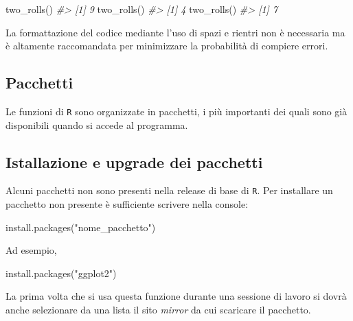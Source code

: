 \documentclass[
  11pt,
]{krantz}
\makeatletter
\newenvironment{Shaded}{\begin{snugshade}}{\end{snugshade}}
\newcommand{\CommentTok}[1]{\textcolor[rgb]{0.37,0.37,0.37}{\textit{#1}}}
\newcommand{\FunctionTok}[1]{\textcolor[rgb]{0,0,0}{#1}}
\newcommand{\NormalTok}[1]{#1}
\newcommand{\StringTok}[1]{\textcolor[rgb]{0.5,0.5,0.5}{#1}}
\newenvironment{kframe}{%
\medskip{}
\setlength{\fboxsep}{.8em}
 \def\at@end@of@kframe{}%
 \ifinner\ifhmode%
  \def\at@end@of@kframe{\end{minipage}}%
  \begin{minipage}{\columnwidth}%
 \fi\fi%
 \def\FrameCommand##1{\hskip\@totalleftmargin \hskip-\fboxsep
 \colorbox{shadecolor}{##1}\hskip-\fboxsep
     \hskip-\linewidth \hskip-\@totalleftmargin \hskip\columnwidth}%
 \MakeFramed {\advance\hsize-\width
   \@totalleftmargin\z@ \linewidth\hsize
   \@setminipage}}%
 {\par\unskip\endMakeFramed%
 \at@end@of@kframe}
\renewenvironment{Shaded}{\begin{kframe}}{\end{kframe}}
\theoremstyle{definition}
\theoremstyle{definition}
\theoremstyle{definition}
\theoremstyle{definition}
\theoremstyle{remark}
\makeatother
\begin{document}
\begin{Shaded}
\begin{Highlighting}[]
\FunctionTok{two\_rolls}\NormalTok{()   }
\CommentTok{\#\textgreater{} [1] 9}
\FunctionTok{two\_rolls}\NormalTok{()}
\CommentTok{\#\textgreater{} [1] 4}
\FunctionTok{two\_rolls}\NormalTok{()}
\CommentTok{\#\textgreater{} [1] 7}
\end{Highlighting}
\end{Shaded}

La formattazione del codice mediante l'uso di spazi e rientri non è necessaria ma è altamente raccomandata per minimizzare la probabilità di compiere errori.

\hypertarget{pacchetti}{%
\subsection{Pacchetti}\label{pacchetti}}

Le funzioni di \texttt{R} sono organizzate in pacchetti, i più importanti dei quali sono già disponibili quando si accede al programma.

\hypertarget{istallazione-e-upgrade-dei-pacchetti}{%
\subsection{Istallazione e upgrade dei pacchetti}\label{istallazione-e-upgrade-dei-pacchetti}}

Alcuni pacchetti non sono presenti nella release di base di \texttt{R}. Per installare un pacchetto non presente è sufficiente scrivere nella console:

\begin{Shaded}
\begin{Highlighting}[]
\FunctionTok{install.packages}\NormalTok{(}\StringTok{"nome\_pacchetto"}\NormalTok{)}
\end{Highlighting}
\end{Shaded}

Ad esempio,

\begin{Shaded}
\begin{Highlighting}[]
\FunctionTok{install.packages}\NormalTok{(}\StringTok{"ggplot2"}\NormalTok{)}
\end{Highlighting}
\end{Shaded}

La prima volta che si usa questa funzione durante una sessione di lavoro si dovrà anche selezionare da una lista il sito \emph{mirror} da cui scaricare il pacchetto.
\end{document}
